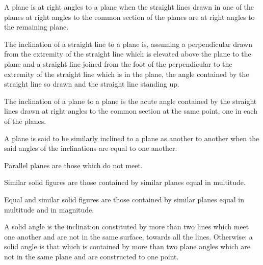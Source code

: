 \begin{scope}
\label{def:XI.4}
A plane is at right angles to a plane when the straight lines drawn
in one of the planes at right angles to the common section of the
planes are at right angles to the remaining plane.
\end{scope}

\begin{scope}
\label{def:XI.5}
The inclination of a straight line to a plane is, assuming a
perpendicular drawn from the extremity of the straight line which is
elevated above the plane to the plane and a straight line joined from
the foot of the perpendicular to the extremity of the straight line
which is in the plane, the angle contained by the straight line so
drawn and the straight line standing up.
\end{scope}

\begin{scope}
\label{def:XI.6}
The inclination of a plane to a plane is the acute angle contained
by the straight lines drawn at right angles to the common section at
the same point, one in each of the planes.
\end{scope}

\begin{scope}
\label{def:XI.7}
A plane is said to be similarly inclined to a plane as another to
another when the said angles of the inclinations are equal to one
another.
\end{scope}

\begin{scope}
\label{def:XI.8}
Parallel planes are those which do not meet.
\end{scope}

\begin{scope}
\label{def:XI.9}
Similar solid figures are those contained by similar planes equal in
multitude.
\end{scope}

\begin{scope}
\label{def:XI.10}
Equal and similar solid figures are those contained by similar planes
equal in multitude and in magnitude.
\end{scope}

\begin{scope}
\label{def:XI.11}
A solid angle is the inclination constituted by more than two lines
which meet one another and are not in the same surface, towards all
the lines.  Otherwise: a solid angle is that which is contained by
more than two plane angles which are not in the same plane and are
constructed to one point.
\end{scope}

